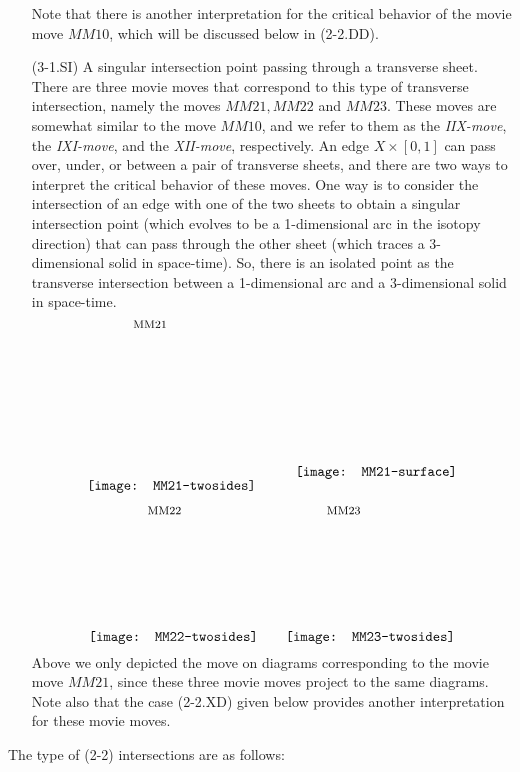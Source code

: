 \documentclass{amsart}\usepackage{amsfonts, amsmath, amssymb}\usepackage{graphicx, epic, epsf, enumerate, stmaryrd}
\theoremstyle{definition}
\numberwithin{equation}{section}
\begin{document}
\begin{enumerate}
Note that there is another interpretation for the critical behavior of the movie move $MM10$, which will be discussed below in (2-2.DD). 

\item[(3-1.SI)] A singular intersection point passing through a transverse sheet. There are three movie moves that correspond to this type of transverse intersection, namely the moves $MM21, MM22$ and $MM23$. These moves are somewhat similar to the move $MM10$, and we refer to them as the \textit{IIX-move}, the \textit{IXI-move}, and the \textit{XII-move}, respectively. An edge $X \times [0, 1]$ can pass over, under, or between a pair of transverse sheets, and there are two ways to interpret the critical behavior of these moves. One way is to consider the intersection of an edge with one of the two sheets to obtain a singular intersection point (which evolves to be a 1-dimensional arc in the isotopy direction) that can pass through the other sheet (which traces a 3-dimensional solid in space-time). So, there is an isolated point as the transverse intersection between a 1-dimensional arc and a 3-dimensional solid in space-time.
\[ \put(33, 121){\fontsize{8}{8}$\text{MM21}$}
\raisebox{5pt}{\texttt{[image: MM21-twosides]}}  \hspace{1cm} \raisebox{15pt}{\texttt{[image: MM21-surface]}} 
\] 
\[\put(42, 90){\fontsize{8}{8}$\text{MM22}$}
\put(170, 90){\fontsize{8}{8}$\text{MM23}$}
\raisebox{0pt}{\texttt{[image: MM22-twosides]}} \hspace{0.7cm}
\raisebox{0pt}{\texttt{[image: MM23-twosides]}} \]
Above we only depicted the move on diagrams corresponding to the movie move $MM21$, since these three movie moves project to the same diagrams. Note also that the case (2-2.XD) given below provides another interpretation for these movie moves.
\end{enumerate}

\pagebreak

The type of (2-2) intersections are as follows:
\end{document}
